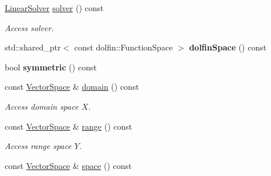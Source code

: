 \begin{DoxyCompactItemize}
\item 
\hyperlink{namespaceSpacy_adcd0d78166a9c972b8a2e5a689fc2d03}{Linear\+Solver} \hyperlink{classSpacy_1_1FEniCS_1_1LinearOperator_aa5aacfc25bb0d710f56c2323753d451f}{solver} () const 
\begin{DoxyCompactList}\small\item\em Access solver. \end{DoxyCompactList}\item 
std\+::shared\+\_\+ptr$<$ const dolfin\+::\+Function\+Space $>$ {\bfseries dolfin\+Space} () const \hypertarget{classSpacy_1_1FEniCS_1_1LinearOperator_a9edb2a6eac66a2379792ef5580fcae75}{}\label{classSpacy_1_1FEniCS_1_1LinearOperator_a9edb2a6eac66a2379792ef5580fcae75}

\item 
bool {\bfseries symmetric} () const \hypertarget{classSpacy_1_1FEniCS_1_1LinearOperator_aa83aaeab285efbb5d636054d06550d64}{}\label{classSpacy_1_1FEniCS_1_1LinearOperator_aa83aaeab285efbb5d636054d06550d64}

\item 
const \hyperlink{classSpacy_1_1VectorSpace}{Vector\+Space} \& \hyperlink{classSpacy_1_1OperatorBase_a2588f9b3e0188820c4c494e63293dc6f}{domain} () const \hypertarget{classSpacy_1_1OperatorBase_a2588f9b3e0188820c4c494e63293dc6f}{}\label{classSpacy_1_1OperatorBase_a2588f9b3e0188820c4c494e63293dc6f}

\begin{DoxyCompactList}\small\item\em Access domain space $X$. \end{DoxyCompactList}\item 
const \hyperlink{classSpacy_1_1VectorSpace}{Vector\+Space} \& \hyperlink{classSpacy_1_1OperatorBase_ab19d3b7a6f290b1079248f1e567e53d6}{range} () const \hypertarget{classSpacy_1_1OperatorBase_ab19d3b7a6f290b1079248f1e567e53d6}{}\label{classSpacy_1_1OperatorBase_ab19d3b7a6f290b1079248f1e567e53d6}

\begin{DoxyCompactList}\small\item\em Access range space $Y$. \end{DoxyCompactList}\item 
const \hyperlink{classSpacy_1_1VectorSpace}{Vector\+Space} \& \hyperlink{classSpacy_1_1VectorBase_aa999dbf9d679d895dfe04c10fbf9f5e9}{space} () const \hypertarget{classSpacy_1_1VectorBase_aa999dbf9d679d895dfe04c10fbf9f5e9}{}\label{classSpacy_1_1VectorBase_aa999dbf9d679d895dfe04c10fbf9f5e9}


\end{DoxyCompactItemize}
